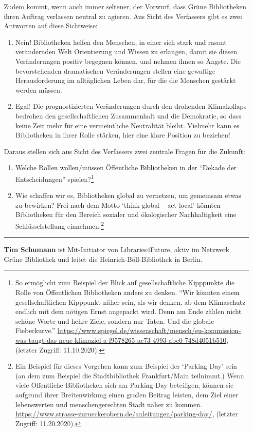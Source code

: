 \documentclass[a4paper,
fontsize=11pt,
oneside,
numbers=noperiodatend,
parskip=half-,
bibliography=totoc,
final
]{scrartcl}
\begin{document}
Zudem kommt, wenn auch immer seltener, der Vorwurf, dass Grüne
Bibliotheken ihren Auftrag verlassen neutral zu agieren. Aus Sicht des
Verfassers gibt es zwei Antworten auf diese Sichtweise:


\begin{enumerate}
\item  Nein! Bibliotheken helfen den Menschen, in einer sich stark und
rasant verändernden Welt Orientierung und Wissen zu erlangen, damit sie
diesen Veränderungen positiv begegnen können, und nehmen ihnen so
Ängste. Die bevorstehenden dramatischen Veränderungen stellen eine
gewaltige Herausforderung im alltäglichen Leben dar, für die die
Menschen gestärkt werden müssen.

\item Egal! Die prognostizierten Veränderungen durch den drohenden
Klimakollaps bedrohen den gesellschaftlichen Zusammenhalt und die
Demokratie, so dass keine Zeit mehr für eine vermeintliche Neutralität
bleibt. Vielmehr kann es Bibliotheken in ihrer Rolle stärken, hier eine
klare Position zu beziehen!
\end{enumerate}

Daraus stellen sich aus Sicht des Verfassers zwei zentrale Fragen für
die Zukunft:

\begin{enumerate}
\item Welche Rollen wollen/müssen Öffentliche Bibliotheken in der
\enquote{Dekade der Entscheidungen} spielen?\footnote{So ermöglicht zum
  Beispiel der Blick auf gesellschaftliche Kipppunkte die Rolle von
  Öffentlichen Bibliotheken anders zu denken. \enquote{Wir könnten einem
  gesellschaftlichen Kipppunkt näher sein, als wir denken, ab dem
  Klimaschutz endlich mit dem nötigen Ernst angepackt wird. Denn am Ende
  zählen nicht schöne Worte und hehre Ziele, sondern nur Taten. Und die
  globale Fieberkurve.}
  \url{https://www.spiegel.de/wissenschaft/mensch/eu-kommission-was-taugt-das-neue-klimaziel-a-f9578265-ac73-4993-abc0-748d4051b510},
  (letzter Zugriff: 11.10.2020).}

\item Wie schaffen wir es, Bibliotheken global zu vernetzen, um gemeinsam
etwas zu bewirken? Frei nach dem Motto \enquote*{think global -- act
local} könnten Bibliotheken für den Bereich sozialer und ökologischer
Nachhaltigkeit eine Schlüsselstellung einnehmen.\footnote{Ein Beispiel
  für dieses Vorgehen kann zum Beispiel der \enquote*{Parking Day} sein
  (an dem zum Beispiel die Stadtbibliothek Frankfurt/Main teilnimmt.)
  Wenn viele Öffentliche Bibliotheken sich am Parking Day beteiligen,
  können sie aufgrund ihrer Breitenwirkung einen großen Beitrag leisten,
  dem Ziel einer lebenswerten und menschengerechten Stadt näher zu
  kommen.
  \url{https://www.strasse-zurueckerobern.de/anleitungen/parking-day/},
  (letzter Zugriff: 11.20.2020).}
\end{enumerate}

\begin{center}\rule{0.5\linewidth}{0.5pt}\end{center}

\textbf{Tim Schumann} ist Mit-Initiator von Libraries4Future, aktiv im
Netzwerk Grüne Bibliothek und leitet die Heinrich-Böll-Bibliothek in
Berlin.
\end{document}
